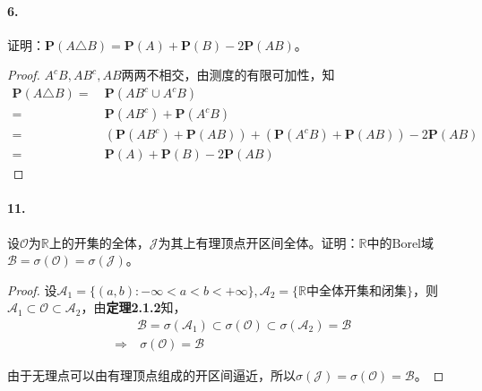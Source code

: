 \documentclass[12pt, a4paper, oneside]{ctexart}
\begin{document}
\paragraph{6.}证明：$\textbf{P}(A\triangle B) = \textbf{P}(A)+\textbf{P}(B)-2\textbf{P}(AB)$。
\begin{proof} $A^cB, AB^c, AB$两两不相交，由测度的有限可加性，知
    \begin{equation*}
        \begin{aligned}
            \textbf{P}(A\triangle B) =&\ \textbf{P}(AB^c\cup A^cB)\\
            =&\ \textbf{P}(AB^c)+\textbf{P}(A^cB)\\
            =&\ (\textbf{P}(AB^c)+\textbf{P}(AB))+(\textbf{P}(A^cB)+\textbf{P}(AB))-2\textbf{P}(AB)\\
            =&\ \textbf{P}(A)+\textbf{P}(B)-2\textbf{P}(AB)
        \end{aligned}
    \end{equation*}
\end{proof}

\paragraph{11.}设$\mathscr{O}$为$\mathbb{R}$上的开集的全体，$\mathscr{J}$为其上有理顶点开区间全体。证明：$\mathbb{R}$中的$\text{Borel}$域$\mathscr{B} = \sigma(\mathscr{O}) = \sigma(\mathscr{J})$。
\begin{proof}
    设$\mathscr{A}_1 = \{(a, b):-\infty < a < b < +\infty\},\mathscr{A}_2 = \{\mathbb{R}\text{中全体开集和闭集}\}$，则$\mathscr{A}_1\subset \mathscr{O}\subset \mathscr{A}_2$，由\textbf{定理2.1.2}知，
    \begin{equation*}
        \begin{aligned}
            &\mathscr{B} = \sigma(\mathscr{A}_1)\subset \sigma(\mathscr{O})\subset \sigma(\mathscr{A}_2)=\mathscr{B}\\
            \Rightarrow&\ \sigma(\mathscr{O}) = \mathscr{B}
        \end{aligned}
    \end{equation*}

    由于无理点可以由有理顶点组成的开区间逼近，所以$\sigma(\mathscr{J}) = \sigma(\mathscr{O}) = \mathscr{B}$。
\end{proof}
\end{document}
